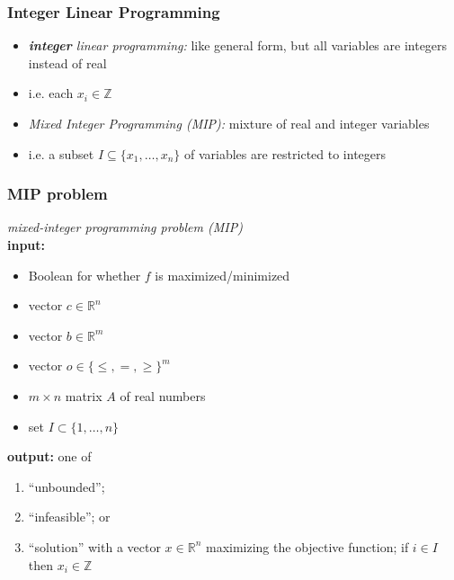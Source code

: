 \documentclass[10pt,aspectratio=169]{beamer}
\begin{document}
\begin{frame} \frametitle{Integer Linear Programming}
  \begin{itemize}
  \item \emph{\textbf{integer} linear programming:} like general form, but all variables are integers instead of real
  \item i.e. each $x_i \in \mathbb{Z}$
  \item \emph{Mixed Integer Programming (MIP):} mixture of real and integer variables
  \item i.e. a subset $I \subseteq \{x_1, \ldots, x_n\}$ of variables are restricted to integers
  \end{itemize}
\end{frame}

\begin{frame} \frametitle{MIP problem}
  \emph{mixed-integer programming problem (MIP)} \\
  \textbf{input:}
  \begin{itemize}
    \item Boolean for whether $f$ is maximized/minimized
    \item vector $c \in \mathbb{R}^n$
    \item vector $b \in \mathbb{R}^m$
    \item vector $o \in \{\leq, =, \geq\}^m$
    \item $m \times n$ matrix $A$ of real numbers
    \item set $I \subset \{1, \ldots, n\}$
  \end{itemize}
  \textbf{output:} one of
  \begin{enumerate}
    \item ``unbounded'';
    \item ``infeasible''; or
    \item ``solution'' with a vector $x \in \mathbb{R}^n$
      maximizing the objective function; if $i \in I$ then $x_i \in \mathbb{Z}$
  \end{enumerate}
\end{frame}
\end{document}
